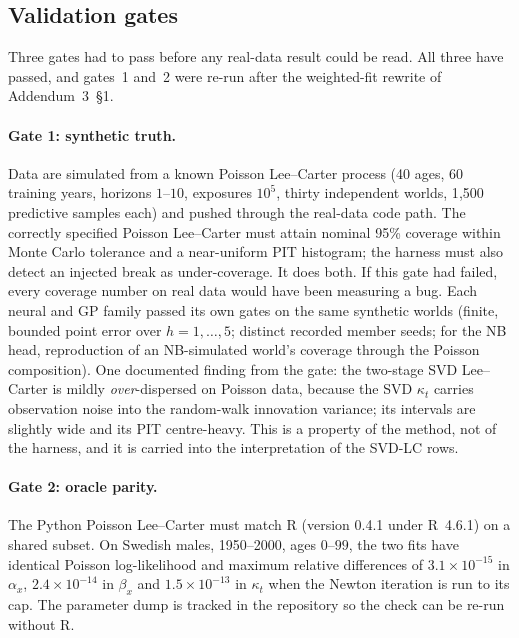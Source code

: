 \subsection{Validation gates}
\label{sec:design-gates}

Three gates had to pass before any real-data result could be read. All three
have passed, and gates~1 and~2 were re-run after the weighted-fit rewrite of
Addendum~3~\S1.

\paragraph{Gate 1: synthetic truth.} Data are simulated from a known Poisson
Lee--Carter process (40 ages, 60 training years, horizons $1$--$10$,
exposures $10^5$, thirty independent worlds, 1{,}500 predictive samples
each) and pushed through the real-data code path. The correctly specified
Poisson Lee--Carter must attain nominal 95\% coverage within Monte Carlo
tolerance and a near-uniform PIT histogram; the harness must also detect an
injected break as under-coverage. It does both. If this gate had failed,
every coverage number on real data would have been measuring a bug. Each
neural and GP family passed its own gates on the same synthetic worlds
(finite, bounded point error over $h=1,\dots,5$; distinct recorded member
seeds; for the NB head, reproduction of an NB-simulated world's coverage
through the Poisson composition). One documented finding from the gate: the
two-stage SVD Lee--Carter is mildly \emph{over}-dispersed on Poisson data,
because the SVD $\kappa_t$ carries observation noise into the random-walk
innovation variance; its intervals are slightly wide and its PIT
centre-heavy. This is a property of the method, not of the harness, and it
is carried into the interpretation of the SVD-LC rows.

\paragraph{Gate 2: oracle parity.} The Python Poisson Lee--Carter must match
R  (version 0.4.1 under R~4.6.1) on a shared subset. On Swedish
males, 1950--2000, ages $0$--$99$, the two fits have identical Poisson
log-likelihood and maximum relative differences of $3.1\times10^{-15}$ in
$\alpha_x$, $2.4\times10^{-14}$ in $\beta_x$ and $1.5\times10^{-13}$ in
$\kappa_t$ when the Newton iteration is run to its cap. The 
parameter dump is tracked in the repository so the check can be re-run
without R.

